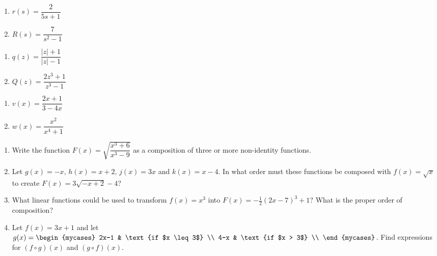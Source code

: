 \documentclass{ximera}
\begin{document}
\begin{multicols}{2}
\begin{enumerate}
\setcounter{enumi}{\value{HW}}

\item  $r(s) = \dfrac{2}{5s+1}$
\item  $R(s) = \dfrac{7}{s^2-1}$

\setcounter{HW}{\value{enumi}}
\end{enumerate}
\end{multicols}

\begin{multicols}{2}
\begin{enumerate}
\setcounter{enumi}{\value{HW}}

\item  $q(z) = \dfrac{|z|+1}{|z|-1}$
\item  $Q(z) = \dfrac{2z^3+1}{z^3-1}$

\setcounter{HW}{\value{enumi}}
\end{enumerate}
\end{multicols}

\begin{multicols}{2}
\begin{enumerate}
\setcounter{enumi}{\value{HW}}

\item  $v(x) = \dfrac{2x+1}{3-4x}$
\item  $w(x) = \dfrac{x^2}{x^4+1}$ \label{breakdownxomexlast}

\setcounter{HW}{\value{enumi}}
\end{enumerate}
\end{multicols}

\begin{enumerate}
\setcounter{enumi}{\value{HW}}

\item Write the function $F(x) = \sqrt{\dfrac{x^{3} + 6}{x^{3} - 9}}$ as a composition of three or more non-identity functions.

\item Let $g(x) = -x, \, h(x) = x + 2, \, j(x) = 3x$ and $k(x) = x - 4$.  In what order must these functions be composed with $f(x) = \sqrt{x}$ to create $F(x) = 3\sqrt{-x + 2} - 4$?

\item What linear functions could be used to transform $f(x) = x^{3}$ into $F(x) = -\frac{1}{2}(2x - 7)^{3} + 1$?  What is the proper order of composition?

\item Let $f(x) = 3x+1$ and let $g(x) =    \begin{mycases}  2x-1 &  \text{if $x \leq 3$} \\   4-x & \text{if $x > 3$} \\  \end{mycases}$.  Find expressions for $(f \circ g)(x)$ and $(g \circ f)(x)$.

\setcounter{HW}{\value{enumi}}
\end{enumerate}
\end{document}

